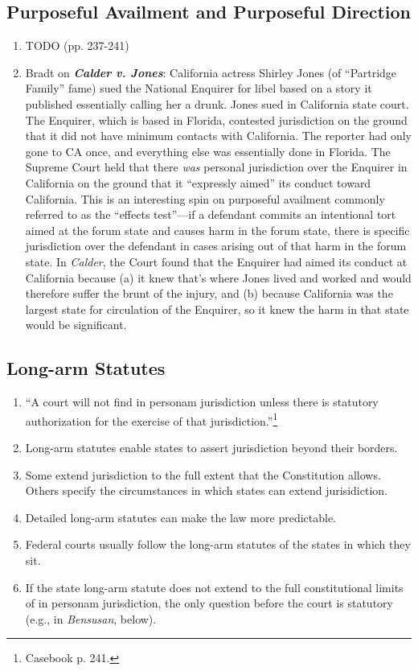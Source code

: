 \subsection{Purposeful Availment and Purposeful Direction}

\begin{enumerate}
    \item TODO (pp. 237-241)
    \item Bradt on \textbf{\emph{Calder v. Jones}}: California actress Shirley Jones (of ``Partridge Family'' fame) sued the National Enquirer for libel based on a story it published essentially calling her a drunk.  Jones sued in California state court.  The Enquirer, which is based in Florida, contested jurisdiction on the ground that it did not have minimum contacts with California.  The reporter had only gone to CA once, and everything else was essentially done in Florida.  The Supreme Court held that there \emph{was} personal jurisdiction over the Enquirer in California on the ground that it ``expressly aimed'' its conduct toward California.  This is an interesting spin on purposeful availment commonly referred to as the ``effects test''---if a defendant commits an intentional tort aimed at the forum state and causes harm in the forum state, there is specific jurisdiction over the defendant in cases arising out of that harm in the forum state.  In \emph{Calder}, the Court found that the Enquirer had aimed its conduct at California because (a) it knew that's where Jones lived and worked and would therefore suffer the brunt of the injury, and (b) because California was the largest state for circulation of the Enquirer, so it knew the harm in that state would be significant.  
\end{enumerate}

\subsection{Long-arm Statutes}

\begin{enumerate}
    \item ``A court will not find in personam jurisdiction unless there is statutory authorization for the exercise of that jurisdiction.''\footnote{Casebook p. 241.}
    \item Long-arm statutes enable states to assert jurisdiction beyond their borders.
    \item Some extend jurisdiction to the full extent that the Constitution allows. Others specify the circumstances in which states can extend jurisidiction.
    \item Detailed long-arm statutes can make the law more predictable.
    \item Federal courts usually follow the long-arm statutes of the states in which they sit.
    \item If the state long-arm statute does not extend to the full constitutional limits of in personam jurisdiction, the only question before the court is statutory (e.g., in \emph{Bensusan}, below).

\end{enumerate}

